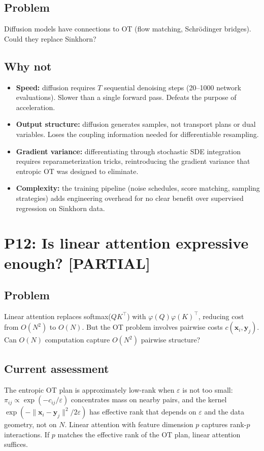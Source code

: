 \documentclass[11pt]{article}
\newcommand{\bx}{\mathbf{x}}
\newcommand{\by}{\mathbf{y}}
\newcommand{\statuspartial}{\textcolor{partial}{\textbf{[PARTIAL]}}}
\begin{document}
\subsection*{Problem}
Diffusion models have connections to OT (flow matching, Schr\"odinger bridges). Could they replace Sinkhorn?

\subsection*{Why not}
\begin{itemize}[nosep,leftmargin=1.5em]
    \item \textbf{Speed:} diffusion requires $T$ sequential denoising steps (20--1000 network evaluations). Slower than a single forward pass. Defeats the purpose of acceleration.
    \item \textbf{Output structure:} diffusion generates samples, not transport plans or dual variables. Loses the coupling information needed for differentiable resampling.
    \item \textbf{Gradient variance:} differentiating through stochastic SDE integration requires reparameterization tricks, reintroducing the gradient variance that entropic OT was designed to eliminate.
    \item \textbf{Complexity:} the training pipeline (noise schedules, score matching, sampling strategies) adds engineering overhead for no clear benefit over supervised regression on Sinkhorn data.
\end{itemize}

\section{P12: Is linear attention expressive enough? \statuspartial}

\subsection*{Problem}
Linear attention replaces softmax($QK^\top$) with $\varphi(Q)\varphi(K)^\top$, reducing cost from $O(N^2)$ to $O(N)$. But the OT problem involves pairwise costs $c(\bx_i, \by_j)$. Can $O(N)$ computation capture $O(N^2)$ pairwise structure?

\subsection*{Current assessment}
The entropic OT plan is approximately low-rank when $\varepsilon$ is not too small: $\pi_{ij} \propto \exp(-c_{ij}/\varepsilon)$ concentrates mass on nearby pairs, and the kernel $\exp(-\|\bx_i - \by_j\|^2/2\varepsilon)$ has effective rank that depends on $\varepsilon$ and the data geometry, not on $N$. Linear attention with feature dimension $p$ captures rank-$p$ interactions. If $p$ matches the effective rank of the OT plan, linear attention suffices.
\end{document}
